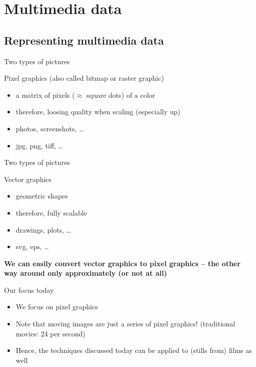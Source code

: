 \section{Multimedia data}

\subsection{Representing multimedia data}

\begin{frame}{Two types of pictures}
  \begin{block}{Pixel graphics (also called bitmap or raster graphic)}
    \begin{itemize}
    \item a matrix of pixels ($\approx$ square dots) of a color
    \item therefore, loosing quality when scaling (especially  up)
    \item photos, screenshots, \ldots
    \item jpg, png, tiff, \ldots
    \end{itemize}
  \end{block}
\end{frame}

\begin{frame}{Two types of pictures}
  \begin{block}{Vector graphics}
    \begin{itemize}
    \item geometric shapes
    \item therefore, fully scalable
    \item drawings, plots, \ldots
    \item svg, eps, \ldots
    \end{itemize}
  \end{block}
  \pause

  \textbf{We can easily convert vector graphics to pixel graphics -- the other way around only approximately (or not at all)}
\end{frame}





\begin{frame}{Our focus today}
  \begin{itemize}
  \item We focus on pixel graphics
  \item Note that moving images are just a series of pixel graphics! (traditional movies: 24 per second)
  \item Hence, the techniques discussed today can be applied to (stills from) films as well
  \end{itemize}
\end{frame}


